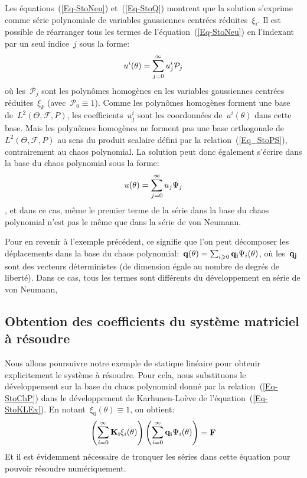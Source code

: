 Les équations~(\ref{Eq-StoNeu}) et~(\ref{Eq-StoQ}) montrent que la solution s'exprime comme série polynomiale de variables gaussiennes centrées réduites~$\xi_i$.
Il est possible de réarranger tous les termes de l'équation~(\ref{Eq-StoNeu}) en l'indexant par un seul indice~$j$ sous la forme:
\begin{equation}
u^i(\theta)=\displaystyle\sum_{j=0}^\infty u_j^i\mathcal{P}_j
\end{equation}
où les~$\mathcal{P}_j$ sont les polynômes homogènes en les variables gaussiennes centrées réduites~$\xi_k$ (avec~$\mathcal{P}_0\equiv1$).
Comme les polynômes homogènes forment une base de~$L^2(\Theta,\mathcal{F},P)$, les coefficients~$u_j^i$ sont les coordonnées de~$u^i(\theta)$ dans cette base.
Mais les polynômes homogènes ne forment pas une base orthogonale de~$L^2(\Theta,\mathcal{F},P)$ au sens du produit scalaire défini par la relation~(\ref{Eq_StoPS}), contrairement au chaos polynomial.
La solution peut donc également s'écrire dans la base du chaos polynomial sous la forme:
\begin{equation}\label{Eq-StoChP}
u(\theta)=\displaystyle\sum_{j=0}^\infty u_j\Psi_j
\end{equation}
, et dans ce cas, même le premier terme de la série dans la base du chaos polynomial n'est pas le même que dans la série de von Neumann.

\medskip
Pour en revenir à l'exemple précédent, ce signifie que l'on peut décomposer les déplacements dans la base du chaos polynomial:~$\VV{q(\theta)}=\sum_{i\ge0}\VV{q_i}\Psi_i(\theta)$, où les~$\VV{q_j}$ sont des vecteurs déterministes (de dimension égale au nombre de degrés de liberté).
Dans ce cas, tous les termes sont différents du développement en série de von Neumann, 

\medskip
\subsection{Obtention des coefficients du système matriciel à résoudre}

Nous allons poursuivre notre exemple de statique linéaire pour obtenir explicitement le système à résoudre.
Pour cela, nous substituons le développement sur la base du chaos polynomial donné par la relation~(\ref{Eq-StoChP}) dans le développement de Karhunen-Loève de l'équation~(\ref{Eq-StoKLEx}). En notant~$\xi_0(\theta)\equiv1$, on obtient:
\begin{equation}\label{Eq-StoEFEx}
\PP{\dsum_{i=0}^\infty \MM{K_i}\xi_i(\theta)}\PP{\dsum_{i=0}^\infty \VV{q_i}\Psi_i(\theta)} = \VV{F}
\end{equation}
Et il est évidemment nécessaire de tronquer les séries dans cette équation pour pouvoir résoudre numériquement.


